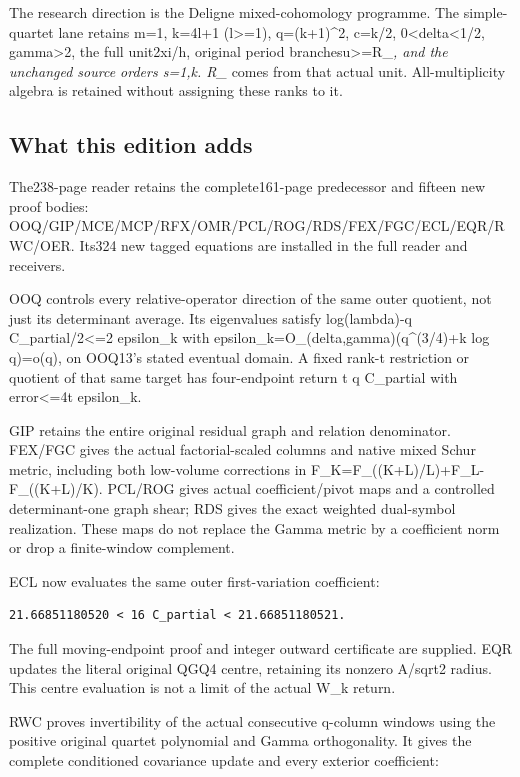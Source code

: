 \documentclass[
]{article}
\begin{document}
The research direction is the Deligne mixed-cohomology programme. The
simple-quartet lane retains m=1, k=4l+1 (l\textgreater=1), q=(k+1)\^{}2,
c=k/2, 0\textless delta\textless1/2, gamma\textgreater2, the full
unit2xi/h, original period
branches\textbar u\textbar\textgreater=R\_\emph{, and the unchanged
source orders s=1,k. R\_} comes from that actual unit. All-multiplicity
algebra is retained without assigning these ranks to it.

\subsection{What this edition adds}\label{what-this-edition-adds}

The238-page reader retains the complete161-page predecessor and fifteen
new proof bodies:
OOQ/GIP/MCE/MCP/RFX/OMR/PCL/ROG/RDS/FEX/FGC/ECL/EQR/RWC/OER. Its324 new
tagged equations are installed in the full reader and receivers.

OOQ controls every relative-operator direction of the same outer
quotient, not just its determinant average. Its eigenvalues satisfy
\textbar log(lambda)-q C\_partial/2\textbar\textless=2 epsilon\_k with
epsilon\_k=O\_(delta,gamma)(q\^{}(3/4)+k log q)=o(q), on OOQ13's stated
eventual domain. A fixed rank-t restriction or quotient of that same
target has four-endpoint return t q C\_partial with error\textless=4t
epsilon\_k.

GIP retains the entire original residual graph and relation denominator.
FEX/FGC gives the actual factorial-scaled columns and native mixed Schur
metric, including both low-volume corrections in
F\_K=F\_((K+L)/L)+F\_L-F\_((K+L)/K). PCL/ROG gives actual
coefficient/pivot maps and a controlled determinant-one graph shear; RDS
gives the exact weighted dual-symbol realization. These maps do not
replace the Gamma metric by a coefficient norm or drop a finite-window
complement.

ECL now evaluates the same outer first-variation coefficient:

\begin{verbatim}
21.66851180520 < 16 C_partial < 21.66851180521.
\end{verbatim}

The full moving-endpoint proof and integer outward certificate are
supplied. EQR updates the literal original QGQ4 centre, retaining its
nonzero A/sqrt2 radius. This centre evaluation is not a limit of the
actual W\_k return.

RWC proves invertibility of the actual consecutive q-column windows
using the positive original quartet polynomial and Gamma orthogonality.
It gives the complete conditioned covariance update and every exterior
coefficient:
\end{document}
